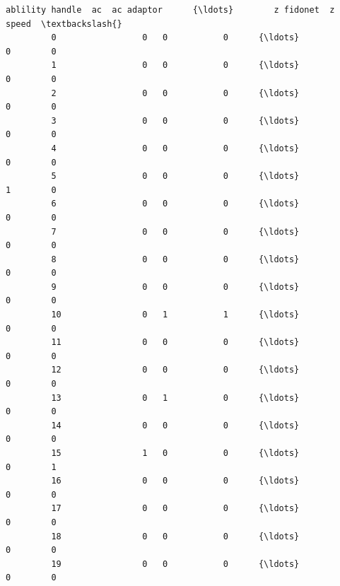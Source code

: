 \documentclass[11pt]{article}
\begin{document}
\begin{Verbatim}[commandchars=\\\{\}]
             ablility handle  ac  ac adaptor      {\ldots}        z fidonet  z speed  \textbackslash{}
         0                 0   0           0      {\ldots}                0        0   
         1                 0   0           0      {\ldots}                0        0   
         2                 0   0           0      {\ldots}                0        0   
         3                 0   0           0      {\ldots}                0        0   
         4                 0   0           0      {\ldots}                0        0   
         5                 0   0           0      {\ldots}                1        0   
         6                 0   0           0      {\ldots}                0        0   
         7                 0   0           0      {\ldots}                0        0   
         8                 0   0           0      {\ldots}                0        0   
         9                 0   0           0      {\ldots}                0        0   
         10                0   1           1      {\ldots}                0        0   
         11                0   0           0      {\ldots}                0        0   
         12                0   0           0      {\ldots}                0        0   
         13                0   1           0      {\ldots}                0        0   
         14                0   0           0      {\ldots}                0        0   
         15                1   0           0      {\ldots}                0        1   
         16                0   0           0      {\ldots}                0        0   
         17                0   0           0      {\ldots}                0        0   
         18                0   0           0      {\ldots}                0        0   
         19                0   0           0      {\ldots}                0        0   
         

\end{Verbatim}
\end{document}
